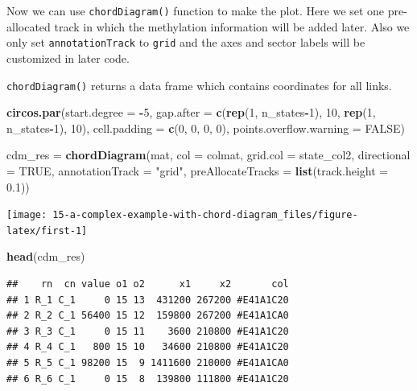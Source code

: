 \documentclass[]{book}
\newenvironment{Shaded}{\begin{snugshade}}{\end{snugshade}}
\newcommand{\KeywordTok}[1]{\textcolor[rgb]{0.13,0.29,0.53}{\textbf{#1}}}
\newcommand{\DataTypeTok}[1]{\textcolor[rgb]{0.13,0.29,0.53}{#1}}
\newcommand{\DecValTok}[1]{\textcolor[rgb]{0.00,0.00,0.81}{#1}}
\newcommand{\FloatTok}[1]{\textcolor[rgb]{0.00,0.00,0.81}{#1}}
\newcommand{\StringTok}[1]{\textcolor[rgb]{0.31,0.60,0.02}{#1}}
\newcommand{\OtherTok}[1]{\textcolor[rgb]{0.56,0.35,0.01}{#1}}
\newcommand{\OperatorTok}[1]{\textcolor[rgb]{0.81,0.36,0.00}{\textbf{#1}}}
\newcommand{\NormalTok}[1]{#1}
\theoremstyle{definition}
\theoremstyle{definition}
\theoremstyle{remark}
\begin{document}
Now we can use \texttt{chordDiagram()} function to make the plot. Here
we set one pre-allocated track in which the methylation information will
be added later. Also we only set \texttt{annotationTrack} to
\texttt{grid} and the axes and sector labels will be customized in later
code.

\texttt{chordDiagram()} returns a data frame which contains coordinates
for all links.

\begin{Shaded}
\begin{Highlighting}[]
\KeywordTok{circos.par}\NormalTok{(}\DataTypeTok{start.degree =} \OperatorTok{-}\DecValTok{5}\NormalTok{, }\DataTypeTok{gap.after =} \KeywordTok{c}\NormalTok{(}\KeywordTok{rep}\NormalTok{(}\DecValTok{1}\NormalTok{, n_states}\OperatorTok{-}\DecValTok{1}\NormalTok{), }\DecValTok{10}\NormalTok{, }\KeywordTok{rep}\NormalTok{(}\DecValTok{1}\NormalTok{, n_states}\OperatorTok{-}\DecValTok{1}\NormalTok{), }\DecValTok{10}\NormalTok{),}
    \DataTypeTok{cell.padding =} \KeywordTok{c}\NormalTok{(}\DecValTok{0}\NormalTok{, }\DecValTok{0}\NormalTok{, }\DecValTok{0}\NormalTok{, }\DecValTok{0}\NormalTok{), }\DataTypeTok{points.overflow.warning =} \OtherTok{FALSE}\NormalTok{)}

\NormalTok{cdm_res =}\StringTok{ }\KeywordTok{chordDiagram}\NormalTok{(mat, }\DataTypeTok{col =}\NormalTok{ colmat, }\DataTypeTok{grid.col =}\NormalTok{ state_col2,}
    \DataTypeTok{directional =} \OtherTok{TRUE}\NormalTok{, }\DataTypeTok{annotationTrack =} \StringTok{"grid"}\NormalTok{, }
    \DataTypeTok{preAllocateTracks =} \KeywordTok{list}\NormalTok{(}\DataTypeTok{track.height =} \FloatTok{0.1}\NormalTok{))}
\end{Highlighting}
\end{Shaded}

\begin{center}\texttt{[image: 15-a-complex-example-with-chord-diagram\_files/figure-latex/first-1]} \end{center}

\begin{Shaded}
\begin{Highlighting}[]
\KeywordTok{head}\NormalTok{(cdm_res)}
\end{Highlighting}
\end{Shaded}

\begin{verbatim}
##    rn  cn value o1 o2      x1     x2       col
## 1 R_1 C_1     0 15 13  431200 267200 #E41A1C20
## 2 R_2 C_1 56400 15 12  159800 267200 #E41A1CA0
## 3 R_3 C_1     0 15 11    3600 210800 #E41A1C20
## 4 R_4 C_1   800 15 10   34600 210800 #E41A1C20
## 5 R_5 C_1 98200 15  9 1411600 210000 #E41A1CA0
## 6 R_6 C_1     0 15  8  139800 111800 #E41A1C20
\end{verbatim}
\end{document}

